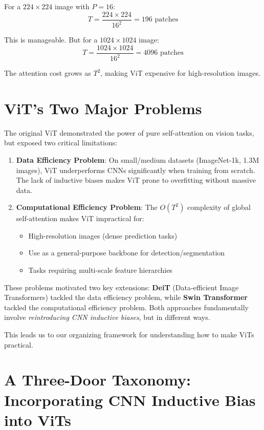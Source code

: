 \documentclass{article}
\begin{document}
For a $224 \times 224$ image with $P=16$:
\begin{equation}
T = \frac{224 \times 224}{16^2} = 196 \text{ patches}
\end{equation}

This is manageable. But for a $1024 \times 1024$ image:
\begin{equation}
T = \frac{1024 \times 1024}{16^2} = 4096 \text{ patches}
\end{equation}

The attention cost grows as $T^2$, making ViT expensive for high-resolution images.

\section{ViT's Two Major Problems}

The original ViT demonstrated the power of pure self-attention on vision tasks, but exposed two critical limitations:

\begin{enumerate}
\item \textbf{Data Efficiency Problem}: On small/medium datasets (ImageNet-1k, 1.3M images), ViT underperforms CNNs significantly when training from scratch. The lack of inductive biases makes ViT prone to overfitting without massive data.

\item \textbf{Computational Efficiency Problem}: The $O(T^2)$ complexity of global self-attention makes ViT impractical for:
\begin{itemize}
    \item High-resolution images (dense prediction tasks)
    \item Use as a general-purpose backbone for detection/segmentation
    \item Tasks requiring multi-scale feature hierarchies
\end{itemize}
\end{enumerate}

These problems motivated two key extensions: \textbf{DeiT} (Data-efficient Image Transformers) tackled the data efficiency problem, while \textbf{Swin Transformer} tackled the computational efficiency problem. Both approaches fundamentally involve \textit{reintroducing CNN inductive biases}, but in different ways.

This leads us to our organizing framework for understanding how to make ViTs practical.

\section{A Three-Door Taxonomy: Incorporating CNN Inductive Bias into ViTs}
\end{document}
